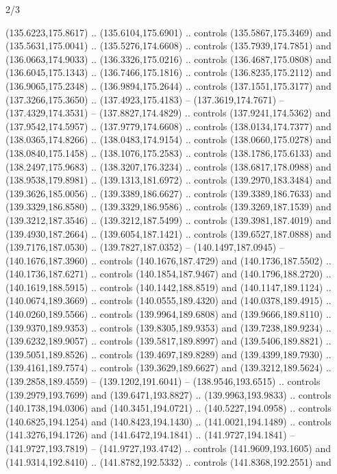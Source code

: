 \begin{flagdescription}{2/3}
\begin{scope}[shift={(0.5\flaglength,0.5)},scale=\flagwidth/320]
\begin{scope}[y=0.8pt, x=0.8pt, yscale=-1,shift={(-118.3,-146)}]
  (135.6223,175.8617) .. (135.6104,175.6901) .. controls (135.5867,175.3469) and
  (135.5631,175.0041) .. (135.5276,174.6608) .. controls (135.7939,174.7851) and
  (136.0663,174.9033) .. (136.3326,175.0216) .. controls (136.4687,175.0808) and
  (136.6045,175.1343) .. (136.7466,175.1816) .. controls (136.8235,175.2112) and
  (136.9065,175.2348) .. (136.9894,175.2644) .. controls (137.1551,175.3177) and
  (137.3266,175.3650) .. (137.4923,175.4183) -- (137.3619,174.7671) --
  (137.4329,174.3531) -- (137.8827,174.4829) .. controls (137.9241,174.5362) and
  (137.9542,174.5957) .. (137.9779,174.6608) .. controls (138.0134,174.7377) and
  (138.0365,174.8266) .. (138.0483,174.9154) .. controls (138.0660,175.0278) and
  (138.0840,175.1458) .. (138.1076,175.2583) .. controls (138.1786,175.6133) and
  (138.2497,175.9683) .. (138.3207,176.3234) .. controls (138.6817,178.0988) and
  (138.9538,179.8981) .. (139.1313,181.6972) .. controls (139.2970,183.3484) and
  (139.3626,185.0056) .. (139.3389,186.6627) .. controls (139.3389,186.7633) and
  (139.3329,186.8580) .. (139.3329,186.9586) .. controls (139.3269,187.1539) and
  (139.3212,187.3546) .. (139.3212,187.5499) .. controls (139.3981,187.4019) and
  (139.4930,187.2664) .. (139.6054,187.1421) .. controls (139.6527,187.0888) and
  (139.7176,187.0530) .. (139.7827,187.0352) -- (140.1497,187.0945) --
  (140.1676,187.3960) .. controls (140.1676,187.4729) and (140.1736,187.5502) ..
  (140.1736,187.6271) .. controls (140.1854,187.9467) and (140.1796,188.2720) ..
  (140.1619,188.5915) .. controls (140.1442,188.8519) and (140.1147,189.1124) ..
  (140.0674,189.3669) .. controls (140.0555,189.4320) and (140.0378,189.4915) ..
  (140.0260,189.5566) .. controls (139.9964,189.6808) and (139.9666,189.8110) ..
  (139.9370,189.9353) .. controls (139.8305,189.9353) and (139.7238,189.9234) ..
  (139.6232,189.9057) .. controls (139.5817,189.8997) and (139.5406,189.8821) ..
  (139.5051,189.8526) .. controls (139.4697,189.8289) and (139.4399,189.7930) ..
  (139.4161,189.7574) .. controls (139.3629,189.6627) and (139.3212,189.5624) ..
  (139.2858,189.4559) -- (139.1202,191.6041) -- (138.9546,193.6515) .. controls
  (139.2979,193.7699) and (139.6471,193.8827) .. (139.9963,193.9833) .. controls
  (140.1738,194.0306) and (140.3451,194.0721) .. (140.5227,194.0958) .. controls
  (140.6825,194.1254) and (140.8423,194.1430) .. (141.0021,194.1489) .. controls
  (141.3276,194.1726) and (141.6472,194.1841) .. (141.9727,194.1841) --
  (141.9727,193.7819) -- (141.9727,193.4742) .. controls (141.9609,193.1605) and
  (141.9314,192.8410) .. (141.8782,192.5332) .. controls (141.8368,192.2551) and

\end{scope}
\end{scope}
\end{flagdescription}
